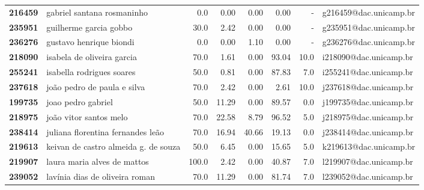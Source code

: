 \documentclass[11pt]{article}
\begin{document}
\begin{center}
\begin{landscape}
\begin{longtable}{llrrrrrl}
\textbf{216459} &            gabriel santana rosmaninho &                   0.0 &        0.00 &        0.00 &        0.00 &                        - &  g216459@dac.unicamp.br \\
\textbf{235951} &                guilherme garcia gobbo &                  30.0 &        2.42 &        0.00 &        0.00 &                        - &  g235951@dac.unicamp.br \\
\textbf{236276} &               gustavo henrique biondi &                   0.0 &        0.00 &        1.10 &        0.00 &                        - &  g236276@dac.unicamp.br \\
\textbf{218090} &            isabela de oliveira garcia &                  70.0 &        1.61 &        0.00 &       93.04 &                     10.0 &  i218090@dac.unicamp.br \\
\textbf{255241} &             isabella rodrigues soares &                  50.0 &        0.81 &        0.00 &       87.83 &                      7.0 &  i255241@dac.unicamp.br \\
\textbf{237618} &           joão pedro de paula e silva &                  70.0 &        2.42 &        0.00 &        2.61 &                     10.0 &  j237618@dac.unicamp.br \\
\textbf{199735} &                    joao pedro gabriel &                  50.0 &       11.29 &        0.00 &       89.57 &                      0.0 &  j199735@dac.unicamp.br \\
\textbf{218975} &                joão vitor santos melo &                  70.0 &       22.58 &        8.79 &       96.52 &                      5.0 &  j218975@dac.unicamp.br \\
\textbf{238414} &     juliana florentina fernandes leão &                  70.0 &       16.94 &       40.66 &       19.13 &                      0.0 &  j238414@dac.unicamp.br \\
\textbf{219613} &  keivan de castro almeida g. de souza &                  50.0 &        6.45 &        0.00 &       15.65 &                      5.0 &  k219613@dac.unicamp.br \\
\textbf{219907} &           laura maria alves de mattos &                 100.0 &        2.42 &        0.00 &       40.87 &                      7.0 &  l219907@dac.unicamp.br \\
\textbf{239052} &        lavínia dias de oliveira roman &                  70.0 &       11.29 &        0.00 &       81.74 &                      7.0 &  l239052@dac.unicamp.br \\

\end{longtable}
\end{landscape}
\end{center}
\end{document}
